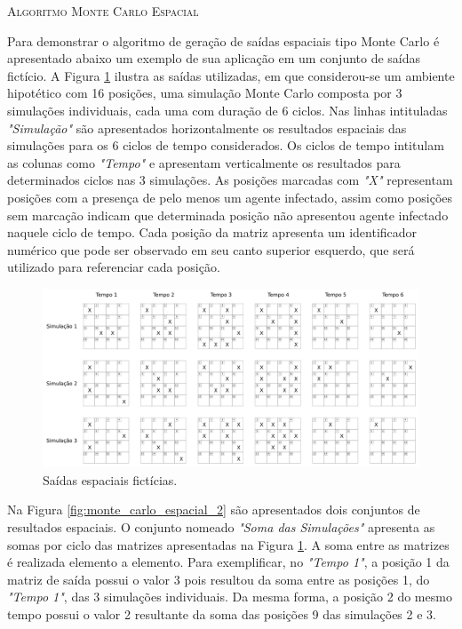 \begin{algorithm}[H]
  \SetAlgoLined   
  
  \caption{\textsc{Algoritmo Monte Carlo Espacial}}
  \label{alg:espacial_media}
\end{algorithm}

Para demonstrar o algoritmo de geração de saídas espaciais tipo Monte Carlo é apresentado abaixo um exemplo de sua aplicação em um conjunto de saídas fictício. A Figura \ref{fig:monte_carlo_espacial_1} ilustra as saídas utilizadas, em que considerou-se um ambiente hipotético com 16 posições, uma simulação Monte Carlo composta por 3 simulações individuais, cada uma com duração de 6 ciclos. Nas linhas intituladas \textit{"Simulação"} são apresentados horizontalmente os resultados espaciais das simulações para os 6 ciclos de tempo considerados. Os ciclos de tempo intitulam as colunas como \textit{"Tempo"} e apresentam verticalmente os resultados para determinados ciclos nas 3 simulações. As posições marcadas com \textit{"X"} representam posições com a presença de pelo menos um agente infectado, assim como posições sem marcação indicam que determinada posição não apresentou agente infectado naquele ciclo de tempo. Cada posição da matriz apresenta um identificador numérico que pode ser observado em seu canto superior esquerdo, que será utilizado para referenciar cada posição. 

\begin{figure}[H]
  \centering
  \includegraphics[width=1\textwidth]{Figuras/Observacoes/MonteCarloEspacial/folha1.png}
  \caption{Saídas espaciais fictícias. }
  \label{fig:monte_carlo_espacial_1}
\end{figure} 

Na Figura \ref{fig:monte_carlo_espacial_2} são apresentados dois conjuntos de resultados espaciais. O conjunto nomeado \textit{"Soma das Simulações"} apresenta as somas por ciclo das matrizes apresentadas na Figura \ref{fig:monte_carlo_espacial_1}. A soma entre as matrizes é realizada elemento a elemento. Para exemplificar, no \textit{"Tempo 1"}, a posição 1 da matriz de saída possui o valor 3 pois resultou da soma entre as posições 1, do \textit{"Tempo 1"}, das 3 simulações individuais. Da mesma forma, a posição 2 do mesmo tempo possui o valor 2 resultante da soma das posições 9 das simulações 2 e 3. 

